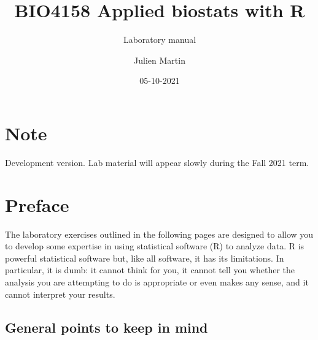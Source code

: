 \documentclass[
  12pt,
]{book}
\title{BIO4158 Applied biostats with R}
\subtitle{Laboratory manual}
\author{Julien Martin}
\date{05-10-2021}
\begin{document}
\maketitle



{
\setcounter{tocdepth}{1}
\tableofcontents
}
\hypertarget{note}{%
\chapter*{Note}\label{note}}

Development version. Lab material will appear slowly during the Fall 2021 term.

\hypertarget{preface}{%
\chapter*{Preface}\label{preface}}

The laboratory exercises outlined in the following pages are designed to allow you to develop some expertise in using statistical software (R)
to analyze data. R is powerful statistical software but, like all software, it has its limitations. In particular, it is dumb: it cannot think for you,
it cannot tell you whether the analysis you are attempting to do is appropriate or even makes any sense, and it cannot interpret your
results.

\hypertarget{general-points-to-keep-in-mind}{%
\section*{General points to keep in mind}\label{general-points-to-keep-in-mind}}
\end{document}
